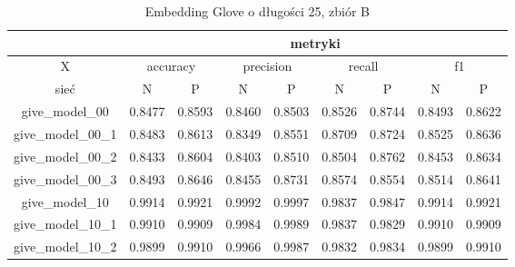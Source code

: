 \begin{table}[!h] \label{tab:wyniki_glove_B} \centering
    \caption{Embedding Glove o długości 25, zbiór B}
    \begin{tabular} {|c|c|c|c|c|c|c|c|c| }    \hline
                                          & \multicolumn{8}{c|}{metryki}                                                                                                                               \\ \hline
        X                                 & \multicolumn{2}{c|}{accuracy} & \multicolumn{2}{c|}{precision} & \multicolumn{2}{c|}{recall} & \multicolumn{2}{c|}{f1}                                     \\ \hline
        sieć                              & N                             & P                              & N                           & P                       & N      & P      & N      & P      \\ \hline
        give\_model\_00                   & 0.8477                        & 0.8593                         & 0.8460                      & 0.8503                  & 0.8526 & 0.8744 & 0.8493 & 0.8622 \\ \hline
        give\_model\_00\_1                & 0.8483                        & 0.8613                         & 0.8349                      & 0.8551                  & 0.8709 & 0.8724 & 0.8525 & 0.8636 \\ \hline
        give\_model\_00\_2                & 0.8433                        & 0.8604                         & 0.8403                      & 0.8510                  & 0.8504 & 0.8762 & 0.8453 & 0.8634 \\ \hline
        give\_model\_00\_3                & 0.8493                        & 0.8646                         & 0.8455                      & 0.8731                  & 0.8574 & 0.8554 & 0.8514 & 0.8641 \\ \hline
        give\_model\_10                   & 0.9914                        & 0.9921                         & 0.9992                      & 0.9997                  & 0.9837 & 0.9847 & 0.9914 & 0.9921 \\ \hline
        give\_model\_10\_1                & 0.9910                        & 0.9909                         & 0.9984                      & 0.9989                  & 0.9837 & 0.9829 & 0.9910 & 0.9909 \\ \hline
        give\_model\_10\_2                & 0.9899                        & 0.9910                         & 0.9966                      & 0.9987                  & 0.9832 & 0.9834 & 0.9899 & 0.9910 \\ \hline

\end{tabular}
\end{table}
